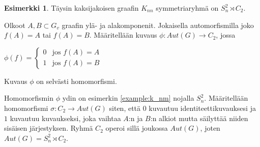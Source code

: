 \documentclass[a4paper, 12pt]{article}
\theoremstyle{definition}
\newtheorem{example}[mydef]{Esimerkki}
\theoremstyle{plain}
\begin{document}
\begin{example}
Täysin kaksijakoisen graafin $K_{nn}$ symmetriaryhmä on $ S_n^2 \rtimes C_2 $.

\begin{center}
\end{center}

Olkoot $A, B \subset G_v$ graafin ylä- ja alakomponenit. Jokaisella automorfismilla joko $f(A) = A$ tai $f(A) = B$. Määritellään kuvaus $\phi: Aut(G) \rightarrow C_2$, jossa
\begin{center}
\begin{math}
\phi(f) =
\left\{
	\begin{array}{ll}
		0  & \mbox{jos } f(A) = A \\
		1 & \mbox{jos } f(A) = B
	\end{array}
\right.
\end{math}
\end{center}
Kuvaus $\phi$ on selvästi homomorfismi.

Homomorfismin $\phi$ ydin on esimerkin \ref{example:k_nm} nojalla $S_n^2$. Määritellään homomorfismi $\sigma: C_2 \rightarrow Aut(G)$ siten, että $0$ kuvautuu identiteettikuvauksesi ja $1$ kuvautuu kuvaukseksi, joka vaihtaa $A$:n ja $B$:n alkiot mutta säilyttää niiden sisäisen järjestyksen. Ryhmä $C_2$ operoi sillä joukossa $Aut(G)$, joten $Aut(G) = S_n^2 \rtimes C_2 $.
\end{example}
\end{document}
